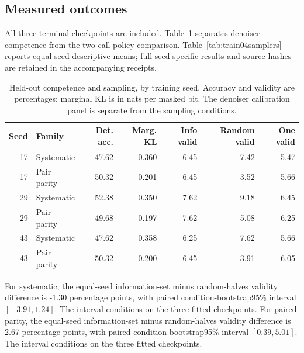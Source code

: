 \subsection{Measured outcomes}
All three terminal checkpoints are included. Table~\ref{tab:train04competence} separates denoiser competence from the two-call policy comparison. Table~\ref{tab:train04samplers} reports equal-seed descriptive means; full seed-specific results and source hashes are retained in the accompanying receipts.
\begin{table}[htbp]
\centering\small
\setlength{\tabcolsep}{4pt}
\caption{Held-out competence and sampling, by training seed. Accuracy and validity are percentages; marginal KL is in nats per masked bit. The denoiser calibration panel is separate from the sampling conditions.}
\label{tab:train04competence}
\begin{tabular}{@{}rlrrrrr@{}}
\toprule
Seed & Family & Det. acc. & Marg. KL & Info valid & Random valid & One valid\\
\midrule
17 & Systematic & 47.62 & 0.360 & 6.45 & 7.42 & 5.47\\
17 & Pair parity & 50.32 & 0.201 & 6.45 & 3.52 & 5.66\\
29 & Systematic & 52.38 & 0.350 & 7.62 & 9.18 & 6.45\\
29 & Pair parity & 49.68 & 0.197 & 7.62 & 5.08 & 6.25\\
43 & Systematic & 47.62 & 0.358 & 6.25 & 7.62 & 5.66\\
43 & Pair parity & 50.32 & 0.200 & 6.45 & 3.91 & 6.05\\
\bottomrule
\end{tabular}
\end{table}
For systematic, the equal-seed information-set minus random-halves validity difference is -1.30 percentage points, with paired condition-bootstrap95\% interval $[-3.91,1.24]$. The interval conditions on the three fitted checkpoints.
For paired parity, the equal-seed information-set minus random-halves validity difference is 2.67 percentage points, with paired condition-bootstrap95\% interval $[0.39,5.01]$. The interval conditions on the three fitted checkpoints.
